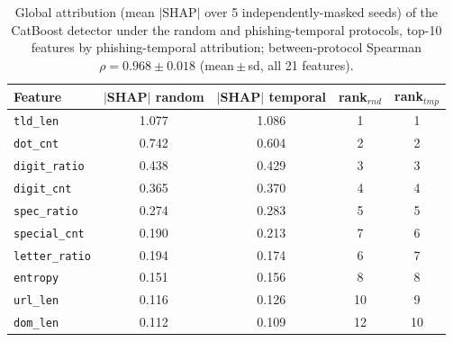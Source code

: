 \begin{table}[t]\centering
\caption{Global attribution (mean $|$SHAP$|$ over 5 independently-masked seeds) of the CatBoost detector under the random and phishing-temporal protocols, top-10 features by phishing-temporal attribution; between-protocol Spearman $\rho = 0.968\pm0.018$ (mean\,$\pm$\,sd, all 21 features).}
\label{tab:shapcontrast}
\begin{tabular}{lcccc}\toprule
Feature & $|$SHAP$|$ random & $|$SHAP$|$ temporal & rank$_{rnd}$ & rank$_{tmp}$ \\ \midrule
\texttt{tld\_len} & 1.077 & 1.086 & 1 & 1 \\
\texttt{dot\_cnt} & 0.742 & 0.604 & 2 & 2 \\
\texttt{digit\_ratio} & 0.438 & 0.429 & 3 & 3 \\
\texttt{digit\_cnt} & 0.365 & 0.370 & 4 & 4 \\
\texttt{spec\_ratio} & 0.274 & 0.283 & 5 & 5 \\
\texttt{special\_cnt} & 0.190 & 0.213 & 7 & 6 \\
\texttt{letter\_ratio} & 0.194 & 0.174 & 6 & 7 \\
\texttt{entropy} & 0.151 & 0.156 & 8 & 8 \\
\texttt{url\_len} & 0.116 & 0.126 & 10 & 9 \\
\texttt{dom\_len} & 0.112 & 0.109 & 12 & 10 \\
\bottomrule\end{tabular}\end{table}

